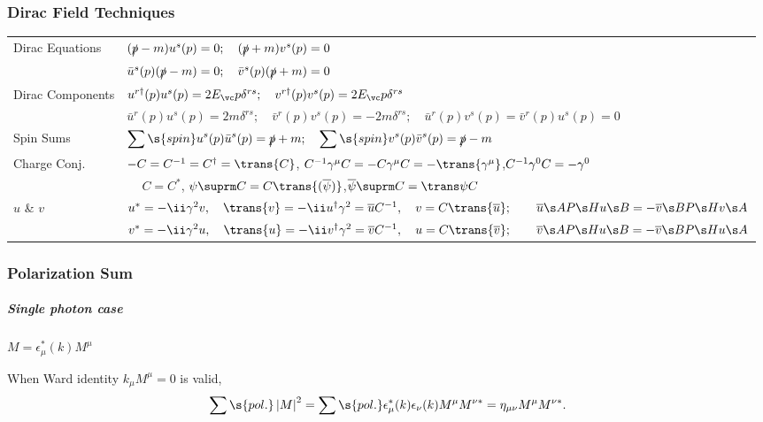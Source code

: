 \subsubsection{Dirac Field Techniques}
\begin{tabular}{l@{ :\ \ \ }l}
Dirac Equations & $(\slashed p-m)u^s(p)=0;\quad(\slashed p+m)v^s(p)=0$\\
&$\bar u^s(p)(\slashed p-m)=0;\quad \bar v^s(p)(\slashed p+m)=0$\\
Dirac Components &
   $u^{r\dagger}(p) u^s(p)=2E_\vc p\delta^{rs};\quad
    v^{r\dagger}(p) v^s(p)=2E_\vc p\delta^{rs}$\\
 & $\bar u^r(p)u^s(p)=2m\delta^{rs};\quad
    \bar v^r(p)v^s(p)=-2m\delta^{rs};\quad
    \bar u^r(p)v^s(p)=\bar v^r(p)u^s(p)=0$\\
Spin Sums & $\displaystyle
             \sum\s{spin}u^s(p)\bar u^s(p)=\slashed p+m;\quad
             \sum\s{spin}v^s(p)\bar v^s(p)=\slashed p-m$\\
Charge Conj.   & $-C=C^{-1}=C^\dagger=\trans{C}$,   \quad $C^{-1}\Gm C=-C\Gm C=-\trans{\Gm}$,\quad $C^{-1}\G0C=-\G0$\\
               & $\phantom{-}C=C^*$\hspace{57.6pt}, \quad $\psi\suprm C=C\trans{(\overline\psi)}$,\quad$\overline\psi{}\suprm C=\trans\psi C$\\
 $u$ \& $v$    & $u^*=-\ii\G2v,\quad \trans{v}=-\ii u^\dagger\G2 = \overline u C^{-1}, \quad v=C\trans{\overline u};  \qquad \overline u\s A {P\s H} u\s B = -\overline v\s B{P\s H}v\s A$\\
               & $v^*=-\ii\G2u,\quad \trans{u}=-\ii v^\dagger\G2 = \overline v C^{-1}, \quad u=C\trans{\overline v}; \qquad \overline v\s A {P\s H} u\s B = -\overline v\s B{P\s H}u\s A$\\
\end{tabular}

\subsubsection{Polarization Sum}

\subparagraph{Single photon case}$M=\epsilon_\mu^*(k)M^{\mu}$\par
When Ward identity $k_\mu M^\mu=0$ is valid,
\begin{equation}
   \sum\s{pol.}\left|M\right|^2
= \sum\s{pol.}\epsilon_\mu^*(k)\epsilon_\nu(k)M^{\mu}M^{\nu*}
=             \Hmnd M^{\mu}M^{\nu*}.
\end{equation}

